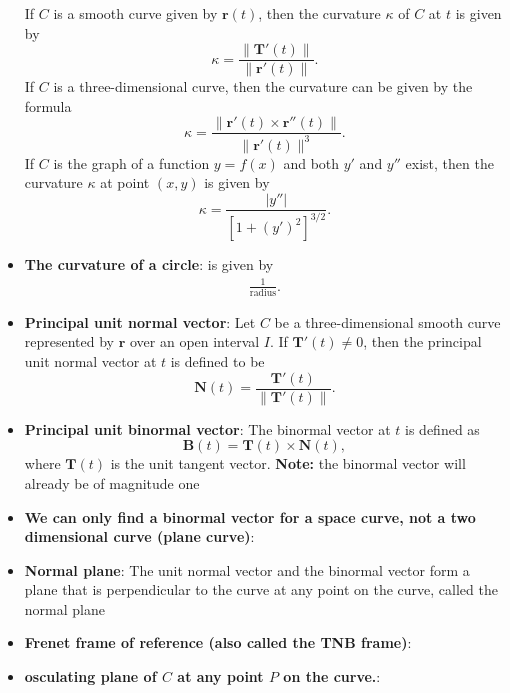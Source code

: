 \documentclass{report}
\begin{document}
\begin{itemize}
            If $C$ is a smooth curve given by $\mathbf{r}(t)$, then the curvature $\kappa$ of $C$ at $t$ is given by
            \begin{equation}
                \kappa = \frac{\|\mathbf{T}'(t)\|}{\|\mathbf{r}'(t)\|}.
            \end{equation}
            If $C$ is a three-dimensional curve, then the curvature can be given by the formula
            \begin{equation}
                \kappa = \frac{\|\mathbf{r}'(t) \times \mathbf{r}''(t)\|}{\|\mathbf{r}'(t)\|^3}.
            \end{equation}
            If $C$ is the graph of a function $y=f(x)$ and both $y'$ and $y''$ exist, then the curvature $\kappa$ at point $(x,y)$ is given by
            \begin{equation}
                \kappa = \frac{|y''|}{[1+(y')^2]^{3/2}}.
            \end{equation}
        \item \textbf{The curvature of a circle}: is given by 
            \begin{align*}
                \frac{1}{\text{radius}}
            .\end{align*}
        \item \textbf{Principal unit normal vector}:
            Let $C$ be a three-dimensional smooth curve represented by $\mathbf{r}$ over an open interval $I$. If $\mathbf{T}'(t) \neq 0$, then the principal unit normal vector at $t$ is defined to be
            \begin{equation}
                \mathbf{N}(t) = \frac{\mathbf{T}'(t)}{\|\mathbf{T}'(t)\|}.
            \end{equation}
        \item \textbf{Principal unit binormal vector}:
            The binormal vector at $t$ is defined as
            \begin{equation}
                \mathbf{B}(t) = \mathbf{T}(t) \times \mathbf{N}(t),
            \end{equation}
            where $\mathbf{T}(t)$ is the unit tangent vector.
            \bigbreak \noindent 
            \textbf{Note:} the binormal vector will already be of magnitude one
        \item \textbf{We can only find a binormal vector for a space curve, not a two dimensional curve (plane curve)}:
        \item \textbf{Normal plane}: The unit normal vector and the binormal vector form a plane that is perpendicular to the curve at any point on the curve, called the normal plane
        \item \textbf{Frenet frame of reference (also called the TNB frame)}:
        \item \textbf{osculating plane of $C$ at any point $P$ on the curve.}:
    \end{itemize}
\end{document}
